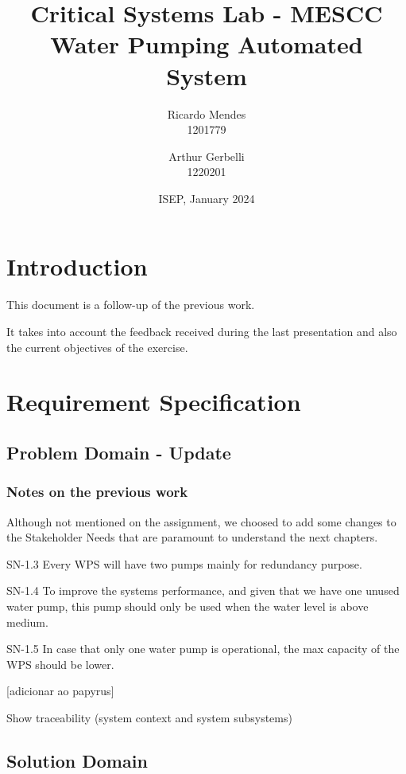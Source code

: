 \documentclass[11pt]{article}
\title{\textbf{Critical Systems Lab - MESCC\\ Water Pumping Automated System}}
\date{ISEP, January 2024}
\author{Ricardo Mendes\\ 1201779
\and Arthur Gerbelli\\ 1220201}
\begin{document}
\maketitle              
\newpage
\tableofcontents
\newpage

%
\section{Introduction}

This document is a follow-up of the previous work.

It takes into account the feedback received during the last presentation and also the current objectives of the exercise.

\section{Requirement Specification}

\subsection{Problem Domain - Update}

\subsubsection{Notes on the previous work}

Although not mentioned on the assignment, we choosed to add some changes to the Stakeholder Needs that are paramount to understand the next chapters.




SN-1.3 Every WPS will have two pumps mainly for redundancy purpose.

SN-1.4 To improve the systems performance, and given that we have one unused water pump, this pump should only be used when the water level is above medium.

SN-1.5 In case that only one water pump is operational, the max capacity of the WPS should be lower.

[adicionar ao papyrus]


Show traceability (system context and system subsystems)

\subsection{Solution Domain}
\end{document}

